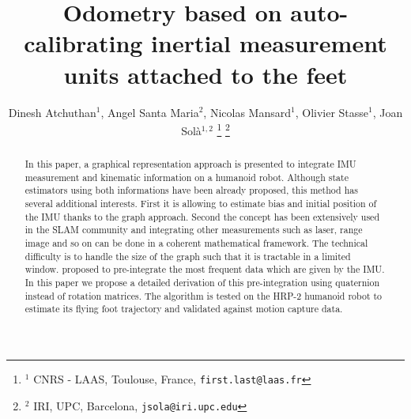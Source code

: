 \documentclass[letterpaper, 10 pt, conference]{ieeeconf}  %
\title{\LARGE \bf
Odometry based on auto-calibrating inertial measurement units attached to the feet
}
\author{Dinesh Atchuthan$^{1}$, Angel Santa Maria$^{2}$, Nicolas Mansard$^1$, Olivier Stasse$^1$, Joan Sol\`a$^{1,2}$%
\thanks{$^{1}$ CNRS - LAAS, Toulouse, France, \tt {\small first.last@laas.fr}}%
\thanks{$^{2}$ IRI, UPC, Barcelona, \tt{\small jsola@iri.upc.edu}}
}
\begin{document}
\maketitle
\thispagestyle{empty}
\pagestyle{empty}

\begin{abstract}
In this paper, a graphical representation approach is presented to integrate 
IMU measurement and kinematic information on a humanoid robot. Although state estimators using both
informations \cite{Johnson:jof:2016,Fallon:ichr:2014} have been already proposed, this method has several additional interests.
First it is allowing to estimate bias and initial position of the IMU thanks to the graph
approach. Second the concept has been extensively used in the SLAM community and integrating 
other measurements such as laser, range image and so on can be done in a coherent mathematical framework.
The technical difficulty is to handle the size of the graph such that it is tractable in a limited window.
\cite{forster2015imu} proposed to pre-integrate the most frequent data which are given by the IMU.
In this paper we propose a detailed derivation of this pre-integration using quaternion instead
of rotation matrices. The algorithm is tested on the HRP-2 humanoid robot to estimate
its flying foot trajectory and validated against motion capture data.
\end{abstract}











\end{document}
